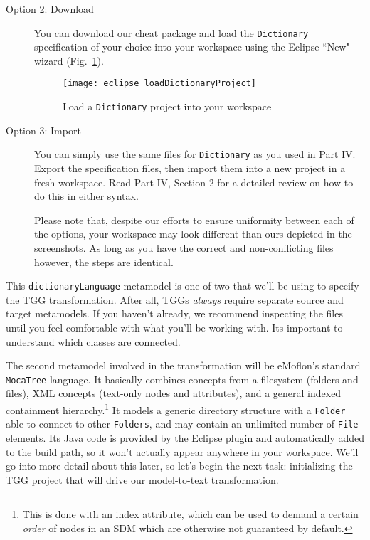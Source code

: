 \begin{description}
\newpage %

\item[Option 2: Download] You can download our cheat package and load the \texttt{Dictionary} specification of your choice into your workspace using
the Eclipse ``New" wizard (Fig.~\ref{eclipse_cheatPackage}).

\vspace{0.5cm}

\begin{figure}[htbp]
\begin{center}
  \texttt{[image: eclipse\_loadDictionaryProject]}
  \caption{Load a \texttt{Dictionary} project into your workspace}
  \label{eclipse_cheatPackage}
\end{center}
\end{figure}

\vspace{2cm}

\item[Option 3: Import] You can simply use the same files for \texttt{Dictionary} as you used in Part IV. Export the specification files, then import them
into a new project in a fresh workspace. Read Part IV, Section 2 for a detailed review on how to do this in either syntax.

\vspace{0.5cm}

Please note that, despite our efforts to ensure uniformity between each of the options, your workspace may look different than ours depicted in the
screenshots. As long as you have the correct and non-conflicting files however, the steps are identical.

\end{description} 

\newpage

This \texttt{dictionaryLanguage} metamodel is one of two that we'll be using to specify the TGG transformation. After all, TGGs \emph{always} require separate
source and target metamodels. If you haven't already, we recommend inspecting the files until you feel comfortable with what you'll be
working with. Its important to understand which classes are connected.

The second metamodel involved in the transformation will be eMoflon's standard \texttt{MocaTree} language. It basically combines concepts from a filesystem
(folders and files), XML concepts (text-only nodes and attributes), and a general indexed containment hierarchy.\footnote{This is done with an index attribute,
which can be used to demand a certain \emph{order} of nodes in an SDM which are otherwise not guaranteed by default.} It models a generic directory structure
with a \texttt{Folder} able to connect to other \texttt{Folders}, and may contain an unlimited number of \texttt{File} elements. Its Java code is provided by
the Eclipse plugin and automatically added to the build path, so it won't actually appear anywhere in your workspace.  We'll go into more detail about this
later, so let's begin the next task: initializing the TGG project that will drive our model-to-text transformation.







